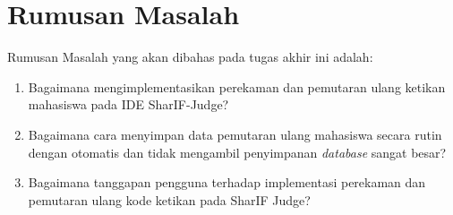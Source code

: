 \begin{comment}
Tugas akhir ini merupakan sebuah pengembangan lanjutan dari tugas akhir yang bertopik ``Implementasi editor kode pada Sharif Judge''~\cite{nicholas:sharif} oleh Nicholas Aditya Halim. Tugas akhir tersebut menceritakan bahwa SharIF-Judge tidak memiliki kemampuan untuk mengawasi proses pembuatan kode program karena para mahasiswa menggunakan aplikasi eksternal untuk pembuatan kode program tersebut. Sehingga dibuatnya modifikasi terhadap SharIF-Judge untuk menambahkan \textit{Intergrated Development Enviroment} (IDE), sebuah aplikasi untuk mengedit, mengompilasi, dan menjalankan kode program pada SharIF-Judge dengan editor kode bernama Ace~\cite{ace}. Gambar~\ref{fig:1:editor-kode} merupakan tampilan editor kode yang sudah diimplementasikan pada SharIF-Judge.

\begin{figure}
    \centering
    \texttt{[image: kode-editor]}
    \caption[Tampilan editor kode pada SharIF-Judge]{Tampilan editor kode pada SharIF-Judge}
    \label{fig:1:editor-kode}
\end{figure}

Tetapi SharIF Judge masih tidak memiliki kemampuan untuk mengawasi proses pembuatan kode program pada aplikasi eksternal maupun IDE dalam SharIF Judge. Maka dari itu tugas akhir ini menambahkan fitur pada SharIF Judge dengan merekam ketikan pada IDE yang tersedia di SharIF-Judge untuk membantu pengawasan dengan merekam dan memutar ulang ketikan mahasiswa. Tugas akhir ini akan membuat pengawasan terhadap kegiatan kuliah lebih mudah untuk pengawas dan dapat menjadi bukti kecurangan jika dibutuhkan.
\end{comment}

\section{Rumusan Masalah}
\label{sec:1:rumusan}

Rumusan Masalah yang akan dibahas pada tugas akhir ini adalah:
\begin{enumerate}
    \item Bagaimana mengimplementasikan perekaman dan pemutaran ulang ketikan mahasiswa pada IDE SharIF-Judge?
    \item Bagaimana cara menyimpan data pemutaran ulang mahasiswa secara rutin dengan otomatis dan tidak mengambil penyimpanan \textit{database} sangat besar?
    \item Bagaimana tanggapan pengguna terhadap implementasi perekaman dan pemutaran ulang kode ketikan pada SharIF Judge?
\end{enumerate}


